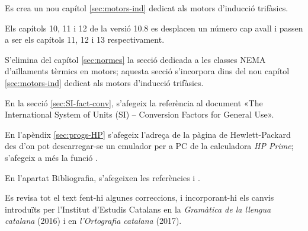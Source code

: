 Es crea un nou capítol \ref{sec:motors-ind} dedicat als motors d'inducció trifàsics.

Els capítols 10, 11 i 12 de la versió 10.8 es desplacen un número cap
avall i passen a ser els capítols 11, 12 i 13 respectivament.

S'elimina del capítol \ref{sec:normes} la secció dedicada a les classes NEMA d’aïllaments tèrmics en motors; aquesta secció s'incorpora dins del nou capítol \ref{sec:motors-ind} dedicat als motors d'inducció trifàsics.

En la secció \ref{sec:SI-fact-conv}, s'afegeix la referència al document «The International System of Units (SI) – Conversion Factors for General Use».

En l'apèndix \ref{sec:progs-HP} s'afegeix l'adreça de la pàgina de Hewlett-Packard des d'on pot descarregar-se un emulador per a PC de la calculadora \emph{HP Prime}; s'afegeix a més la funció .

En l’apartat Bibliografia, s’afegeixen les referències  \cite{JFM} i \cite{WES}.

Es revisa tot el text fent-hi algunes correccions,  i incorporant-hi els canvis introduïts per l’Institut d’Estudis Catalans en la \emph{Gramàtica de la llengua catalana}
(2016) i en \emph{l’Ortografia catalana} (2017).
